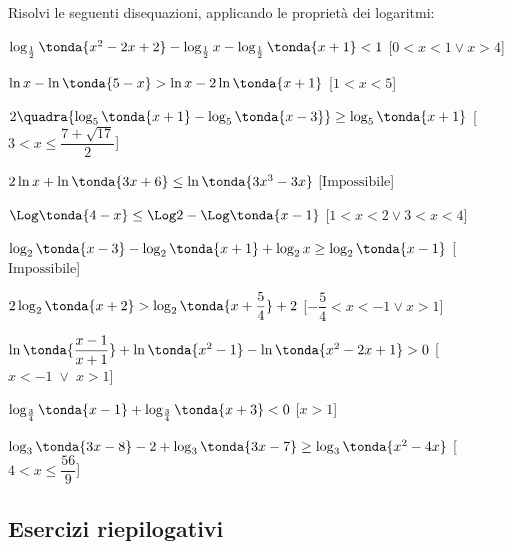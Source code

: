 \begin{esercizio}\label{ese:}
 Risolvi le seguenti disequazioni, applicando le proprietà dei logaritmi:
 \begin{enumeratea}
   \item \(\log_{\frac{1}{2}} \tonda{x^2-2x+2}-\log_{\frac{1}{2}} x- 
\log_{\frac{1}{2}} \tonda{x+1}<1\)
   \hfill [\(0<x<1 \lor x>4\)]
   \item \(\ln x-\ln \tonda{5-x}>\ln x-2\ln  \tonda{x+1}\)
   \hfill [\(1<x<5\)]
   \item \(2 \quadra{\log_5 \tonda{x+1}-\log_5 \tonda{x-3}}\geq\log_5 
\tonda{x+1}\)
   \hfill [\(3<x\leq \dfrac{7+\sqrt{17}}{2}\)]
   \item \(2 \ln x+\ln \tonda{3x+6}\leq\ln \tonda{3x^3-3x}\)
   \hfill [\(\text{Impossibile}\)]
   \item \(\Log \tonda{4-x}\leq\Log 2 -\Log \tonda{x-1}\)
   \hfill [\(1<x<2 \lor 3<x<4\)]
   \item \(\log_2 \tonda{x-3} -\log_2 \tonda{x+1}+\log_2 x \geq \log_2 
\tonda{x-1}\)
   \hfill [\(\text{Impossibile}\)]
   \item \(2 \log_2 \tonda{x+2}>\log_2 \tonda{x+\dfrac{5}{4}}+2\)
   \hfill [\(-\dfrac{5}{4}<x<-1 \lor x >1\)]
   \item \(\ln \tonda{\dfrac{x-1}{x+1}}+\ln \tonda{x^2-1}-\ln 
\tonda{x^2-2x+1}>0\)
   \hfill [\(x<-1 \;\lor\; x>1\)]
   \item \(\log_{\frac{3}{4}} 
\tonda{x-1}+\log_{\frac{3}{4}}\tonda{x+3}<0\)
   \hfill [\(x>1\)]
   \item \(\log_3 \tonda{3x-8}-2+\log_3 \tonda{3x-7}\geq\log_3 
\tonda{x^2-4x}\)
   \hfill [\(4<x\leq\dfrac{56}{9}\)]
 \end{enumeratea}
\end{esercizio}

\newpage %

\subsection{Esercizi riepilogativi}

